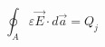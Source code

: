 \documentclass[12pt]{article}
\begin{document}
\begin{displaymath}
\oint_{A} \varepsilon \overrightarrow{E} \cdot d \overrightarrow{a} = Q_{j}
\end{displaymath}
\end{document}
